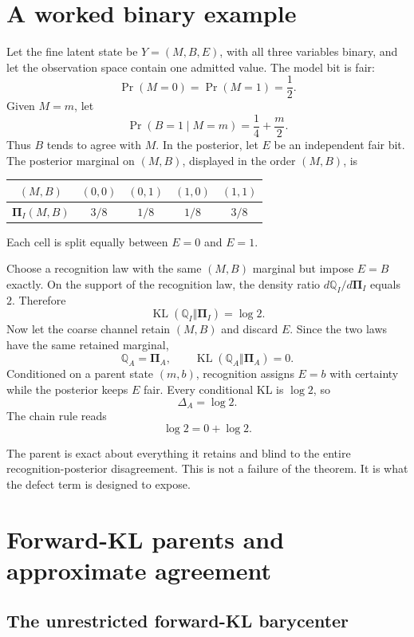 \documentclass[11pt,letterpaper]{article}
\newcommand{\KL}{\operatorname{KL}}
\newcommand{\Rec}{\mathbb Q}
\newcommand{\Post}{\boldsymbol\Pi}
\begin{document}
\section{A worked binary example}

Let the fine latent state be \(Y=(M,B,E)\), with all three variables binary, and let the observation space contain one admitted value. The model bit is fair:
\[
  \Pr(M=0)=\Pr(M=1)=\frac12.
\]
Given \(M=m\), let
\[
  \Pr(B=1\mid M=m)=\frac14+\frac{m}{2}.
\]
Thus \(B\) tends to agree with \(M\). In the posterior, let \(E\) be an independent fair bit. The posterior marginal on \((M,B)\), displayed in the order \((M,B)\), is
\begin{center}
\begin{tabular}{ccccc}
\toprule
\((M,B)\) & \((0,0)\) & \((0,1)\) & \((1,0)\) & \((1,1)\) \\
\midrule
\(\Post_{I}(M,B)\) & \(3/8\) & \(1/8\) & \(1/8\) & \(3/8\) \\
\bottomrule
\end{tabular}
\end{center}
Each cell is split equally between \(E=0\) and \(E=1\).

Choose a recognition law with the same \((M,B)\) marginal but impose \(E=B\) exactly. On the support of the recognition law, the density ratio \(d\Rec_I/d\Post_I\) equals \(2\). Therefore
\[
  \KL(\Rec_I\Vert\Post_I)=\log 2.
\]
Now let the coarse channel retain \((M,B)\) and discard \(E\). Since the two laws have the same retained marginal,
\[
  \Rec_A=\Post_A,
  \qquad
  \KL(\Rec_A\Vert\Post_A)=0.
\]
Conditioned on a parent state \((m,b)\), recognition assigns \(E=b\) with certainty while the posterior keeps \(E\) fair. Every conditional KL is \(\log 2\), so
\[
  \Delta_A=\log 2.
\]
The chain rule reads
\[
  \log 2=0+\log 2.
\]

\begin{physicalreading}
The parent is exact about everything it retains and blind to the entire recognition-posterior disagreement. This is not a failure of the theorem. It is what the defect term is designed to expose.
\end{physicalreading}

\section{Forward-KL parents and approximate agreement}

\subsection{The unrestricted forward-KL barycenter}
\label{sec:barycenter}
\end{document}
